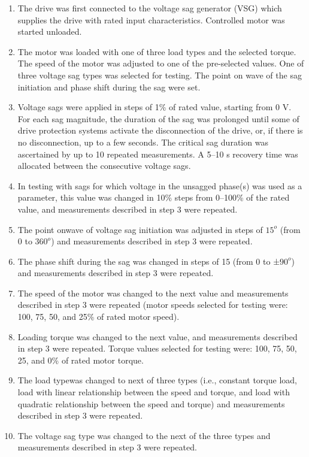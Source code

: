 \documentclass[14pt, a4paper]{extreport}
\begin{document}
 \begin{enumerate}
     \item The drive was first connected to the voltage sag generator (VSG) which supplies the drive with rated input characteristics. Controlled motor was started unloaded.
     
     \item The motor was loaded with one of three load types and the selected torque. The speed of the motor was adjusted to one of the pre-selected values. One of three voltage sag types was selected for testing. The point on wave of the sag initiation and phase shift during the sag were set.
     
     \item Voltage sags were applied in steps of 1\% of rated value, starting from 0 V. For each sag magnitude, the duration of
the sag was prolonged until some of drive protection systems activate the disconnection of the drive, or, if there is no disconnection, up to a few seconds. The critical sag duration was ascertained by up to 10 repeated measurements. A 5–10 s recovery time was allocated between the consecutive voltage sags.

\item In testing with sags for which voltage in the unsagged phase(s) was used as a parameter, this value was changed in 10\% steps from 0–100\% of the rated value, and measurements described in step 3 were repeated.

\item The point onwave of voltage sag initiation was adjusted in steps of $15^{o}$ (from 0 to $360^{o}$) and measurements described in step 3 were repeated.

\item The phase shift during the sag was changed in steps of 15 (from 0 to ±$90^{o}$) and measurements described in step 3 were repeated. 

\item The speed of the motor was changed to the next value and measurements described in step 3 were repeated (motor speeds selected for testing were: 100, 75, 50, and 25\% of rated motor speed).

\item Loading torque was changed to the next value, and measurements described in step 3 were repeated. Torque values selected for testing were: 100, 75, 50, 25, and 0\% of rated motor torque.

\item The load typewas changed to next of three types (i.e., constant torque load, load with linear relationship between the speed and torque, and load with quadratic relationship between the speed and torque) and measurements described in step 3 were repeated.

\item The voltage sag type was changed to the next of the three types and measurements described in step 3 were repeated.


 \end{enumerate}
 
\end{document}
